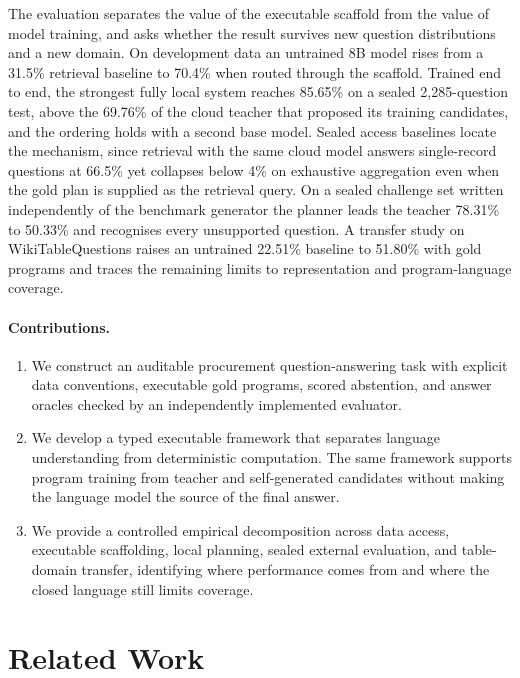 \documentclass{article}
\begin{document}
The evaluation separates the value of the executable scaffold from the
value of model training, and asks whether the result survives new
question distributions and a new domain. On development data an untrained
8B model rises from a 31.5\% retrieval baseline to 70.4\% when routed
through the scaffold. Trained end to end, the strongest fully local
system reaches 85.65\% on a sealed 2{,}285-question test, above the
69.76\% of the cloud teacher that proposed its training candidates, and
the ordering holds with a second base model. Sealed access baselines
locate the mechanism, since retrieval with the same cloud model answers
single-record questions at 66.5\% yet collapses below 4\% on exhaustive
aggregation even when the gold plan is supplied as the retrieval query.
On a sealed challenge set written independently of the benchmark
generator the planner leads the teacher 78.31\% to 50.33\% and
recognises every unsupported question. A transfer study on
WikiTableQuestions raises an untrained 22.51\% baseline to 51.80\% with
gold programs and traces the remaining limits to representation and
program-language coverage.

\paragraph{Contributions.}
\begin{enumerate}
    \item We construct an auditable procurement question-answering task with
    explicit data conventions, executable gold programs, scored abstention,
    and answer oracles checked by an independently implemented evaluator.

    \item We develop a typed executable framework that separates language
    understanding from deterministic computation. The same framework supports
    program training from teacher and self-generated candidates without
    making the language model the source of the final answer.

    \item We provide a controlled empirical decomposition across data
    access, executable scaffolding, local planning, sealed external
    evaluation, and table-domain transfer, identifying where performance
    comes from and where the closed language still limits coverage.
\end{enumerate}

\section{Related Work}
\label{sec:related}
\end{document}
